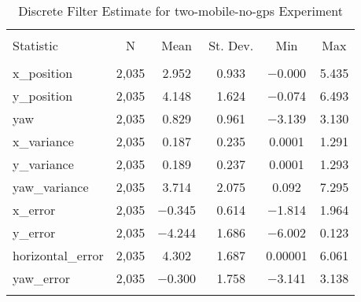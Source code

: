 
\begin{table}[h] \centering 
  \caption{Discrete Filter Estimate for two-mobile-no-gps Experiment} 
  \label{tab:two_mobile_no_gps_discrete_summary} 
\begin{tabular}{@{\extracolsep{5pt}}lccccc} 
\\[-1.8ex]\hline 
\hline \\[-1.8ex] 
Statistic & \multicolumn{1}{c}{N} & \multicolumn{1}{c}{Mean} & \multicolumn{1}{c}{St. Dev.} & \multicolumn{1}{c}{Min} & \multicolumn{1}{c}{Max} \\ 
\hline \\[-1.8ex] 
x\_position & 2,035 & 2.952 & 0.933 & $-$0.000 & 5.435 \\ 
y\_position & 2,035 & 4.148 & 1.624 & $-$0.074 & 6.493 \\ 
yaw & 2,035 & 0.829 & 0.961 & $-$3.139 & 3.130 \\ 
x\_variance & 2,035 & 0.187 & 0.235 & 0.0001 & 1.291 \\ 
y\_variance & 2,035 & 0.189 & 0.237 & 0.0001 & 1.293 \\ 
yaw\_variance & 2,035 & 3.714 & 2.075 & 0.092 & 7.295 \\ 
x\_error & 2,035 & $-$0.345 & 0.614 & $-$1.814 & 1.964 \\ 
y\_error & 2,035 & $-$4.244 & 1.686 & $-$6.002 & 0.123 \\ 
horizontal\_error & 2,035 & 4.302 & 1.687 & 0.00001 & 6.061 \\ 
yaw\_error & 2,035 & $-$0.300 & 1.758 & $-$3.141 & 3.138 \\ 
\hline \\[-1.8ex] 
\end{tabular} 
\end{table} 
